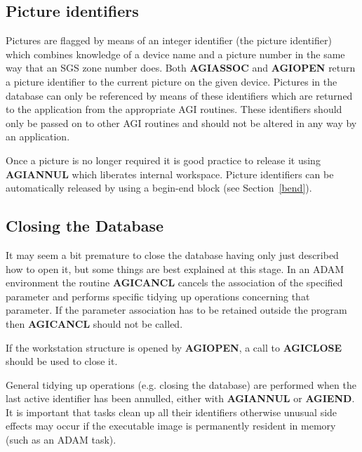 \documentclass[twoside,11pt]{article}
\newcommand{\hyperref}[4]{#2\ref{#4}#3}
\newcommand{\htmlref}[2]{#1}
\renewcommand{\_}{\texttt{\symbol{95}}}
\begin{document}
\subsection{Picture identifiers}

Pictures are flagged by means of an integer identifier (the picture
identifier) which combines knowledge of a device name and a picture
number in the same way that an SGS zone number does. Both 
\htmlref{{\bf AGI\_ASSOC}}{AGI_ASSOC}
and 
\htmlref{{\bf AGI\_OPEN}}{AGI_ASSOC}
return a picture identifier to the current picture on
the given device. Pictures in the database can only be referenced by means
of these identifiers which are returned to the application from the
appropriate AGI routines. These identifiers should only be passed on to
other AGI routines and should not be altered in any way by an application.

Once a picture is no longer required it is good practice to release it using
\htmlref{{\bf AGI\_ANNUL}}{AGI_ANNUL}
 which liberates internal workspace. Picture identifiers
can be automatically released by using a begin-end block (see 
\hyperref{this section}{Section~}{}{bend}).

\subsection{Closing the Database}

It may seem a bit premature to close the database having only just
described how to open it, but some things are best explained at this stage.
In an ADAM environment the routine 
\htmlref{{\bf AGI\_CANCL}}{AGI_CANCL} cancels the
association of the specified parameter and performs specific tidying
up operations concerning that parameter. If the parameter association
has to be retained outside the program then {\bf AGI\_CANCL} should not
be called.

If the workstation structure is opened by {\bf AGI\_OPEN}, a call to
\htmlref{{\bf AGI\_CLOSE}}{AGI_CLOSE} should be used to close it.

General tidying up operations (e.g. closing the database) are performed
when the last active identifier has been annulled, either with
{\bf AGI\_ANNUL} or 
\htmlref{{\bf AGI\_END}}{AGI_END}. It is important that tasks clean
up all their identifiers otherwise unusual side effects may occur if
the executable image is permanently resident in memory (such as an
ADAM task).
\end{document}
